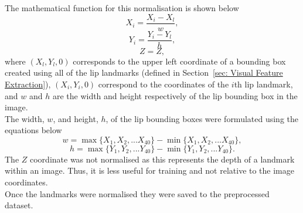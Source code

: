 The mathematical function for this normalisation is shown below
\[X_i = \frac{X_i - X_l}{w},\]
\[Y_i = \frac{Y_i - Y_l}{h},\]
\[Z = Z,\]
where $(X_l, Y_l, 0)$ corresponds to the upper left coordinate of a bounding box created using all of the lip landmarks (defined in Section~\ref{sec: Visual Feature Extraction}), $(X_i, Y_i, 0)$ correspond to the coordinates of the $i$th lip landmark, and $w$ and $h$ are the width and height respectively of the lip bounding box in the image.\\
The width, $w$, and height, $h$, of the lip bounding boxes were formulated using the equations below
\[w = \max\{X_1, X_2,...X_{40}\} - \min\{X_1, X_2,...X_{40}\},\]
\[h = \max\{Y_1, Y_2,...Y_{40}\} - \min\{Y_1, Y_2,...Y_{40}\}.\]
The $Z$ coordinate was not normalised as this represents the depth of a landmark within an image. Thus, it is less useful for training and not relative to the image coordinates.\\
Once the landmarks were normalised they were saved to the preprocessed dataset.
